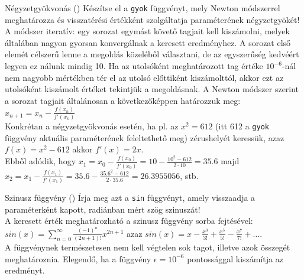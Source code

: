 \documentclass[usenames,dvipsnames,aspectratio=169]{beamer}
\begin{document}
\begin{frame}
    \begin{exampleblock}{Négyzetgyökvonás ()}
        \small
        Készítse el a \texttt{gyok} függvényt, mely Newton módszerrel meghatározza és visszatérési értékként szolgáltatja paraméterének négyzetgyökét! \\
        A módszer iteratív: egy sorozat egymást követő tagjait kell kiszámolni, melyek általában nagyon gyorsan konvergálnak a keresett eredményhez. A sorozat első elemét célszerű lenne a megoldás közeléből választani, de az egyszerűség kedvéért legyen ez nálunk mindig 10. Ha az utolsóként meghatározott tag értéke \( 10^{-6} \)-nál nem nagyobb mértékben tér el az utolsó előttiként kiszámolttól, akkor ezt az utolsóként kiszámolt értéket tekintjük a megoldásnak. A Newton módszer szerint a sorozat tagjait általánosan a következőképpen határozzuk meg: \( x_{n+1} = x_n - \frac{f(x_n)}{f'(x_n)} \) \\
        Konkrétan a négyzetgyökvonás esetén, ha pl. az \( x^2 = 612 \) (itt 612 a \texttt{gyok} függvény aktuális paraméterének feleltethető meg) zérushelyét keressük, azaz \( f(x) = x^2 - 612 \) akkor \( f'(x) = 2x \). \\
        Ebből adódik, hogy \( x_1 = x_0 - \frac{f(x_0)}{f'(x_0)} = 10 - \frac{10^2 - 612}{2 \cdot 10} = 35.6 \) majd \( x_2 = x_1 - \frac{f(x_1)}{f'(x_1)} = 35.6 - \frac{35.6^2 - 612}{2 \cdot 35.6} = 26.3955056 \), stb.
    \end{exampleblock}
\end{frame}

\begin{frame}
    \begin{exampleblock}{Szinusz függvény ()}
        Írja meg azt a \texttt{sin} függvényt, amely visszaadja a paraméterként kapott, radiánban mért szög szinuszát!\\
        \smallskip
        A keresett érték meghatározható a szinusz függvény sorba fejtésével: \( sin(x) = \sum_{n=0}^\infty \frac{(-1)^n}{(2n+1)!} x^{2n+1} \) azaz \( sin(x) = x-\frac{x^3}{3!}+\frac{x^5}{5!}-\frac{x^7}{7!}+\dots \).\\
        \smallskip
        A függvénynek természetesen nem kell végtelen sok tagot, illetve azok összegét meghatároznia. Elegendő, ha a függvény \( \epsilon = 10^{-6} \) pontossággal kiszámítja az eredményt.
    \end{exampleblock}
\end{frame}
\end{document}
